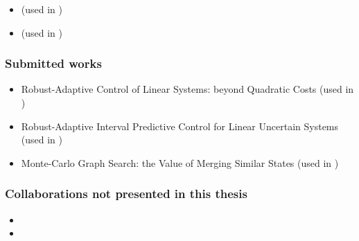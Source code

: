 \begin{itemize}
	\item {} (used in )
	\item {} (used in )
\end{itemize}

\subsubsection*{Submitted works}

\begin{itemize}
	\item Robust-Adaptive Control of Linear Systems: beyond Quadratic Costs (used in )
	\item Robust-Adaptive Interval Predictive Control for Linear Uncertain Systems (used in )
	\item Monte-Carlo Graph Search: the Value of Merging Similar States (used in )
\end{itemize}

\subsubsection*{Collaborations not presented in this thesis}

\begin{itemize}
	\item {}
	\item {}
\end{itemize}